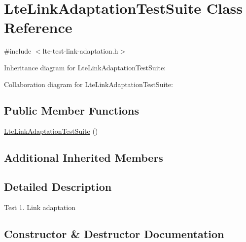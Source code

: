 \hypertarget{classLteLinkAdaptationTestSuite}{}\section{Lte\+Link\+Adaptation\+Test\+Suite Class Reference}
\label{classLteLinkAdaptationTestSuite}


{\ttfamily \#include $<$lte-\/test-\/link-\/adaptation.\+h$>$}



Inheritance diagram for Lte\+Link\+Adaptation\+Test\+Suite\+:


Collaboration diagram for Lte\+Link\+Adaptation\+Test\+Suite\+:
\subsection*{Public Member Functions}
\begin{DoxyCompactItemize}
\item 
\hyperlink{classLteLinkAdaptationTestSuite_a78665fd3513bd0dd752b6f3aec1d64f8}{Lte\+Link\+Adaptation\+Test\+Suite} ()
\end{DoxyCompactItemize}
\subsection*{Additional Inherited Members}


\subsection{Detailed Description}
Test 1. Link adaptation 

\subsection{Constructor \& Destructor Documentation}
